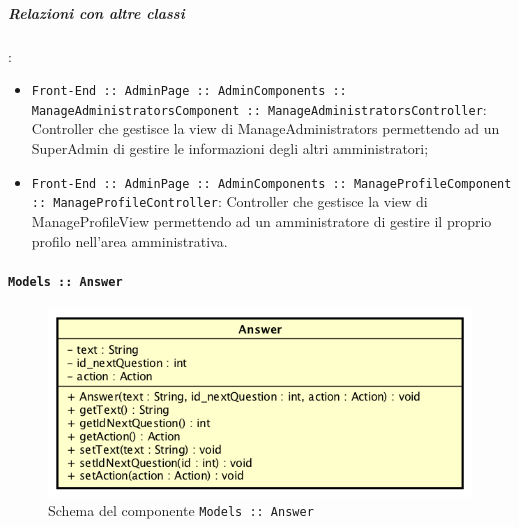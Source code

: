 \documentclass[../DefinizioneDiProdotto_v2.0.0.tex]{subfiles}
\begin{document}
		\subparagraph{Relazioni con altre classi}:
		      \begin{itemize}
		      	\item \texttt{Front-End :: AdminPage :: AdminComponents :: ManageAdministratorsComponent :: ManageAdministratorsController}: Controller che gestisce la view di ManageAdministrators permettendo ad un SuperAdmin di gestire le informazioni degli altri amministratori;
		      	\item \texttt{Front-End :: AdminPage :: AdminComponents :: ManageProfileComponent :: ManageProfileController}: Controller che gestisce la view di ManageProfileView permettendo ad un amministratore di gestire il proprio profilo nell'area amministrativa.
		      \end{itemize}

	\newpage
	\paragraph{\texttt{Models :: Answer}}
	\acapo
	\begin{figure}[!h]
		\centering
		\includegraphics[scale=0.6]{Architettura/Front-End/Models/Answer.png}
		\caption{Schema del componente \texttt{Models :: Answer}}
	\end{figure}
\end{document}
